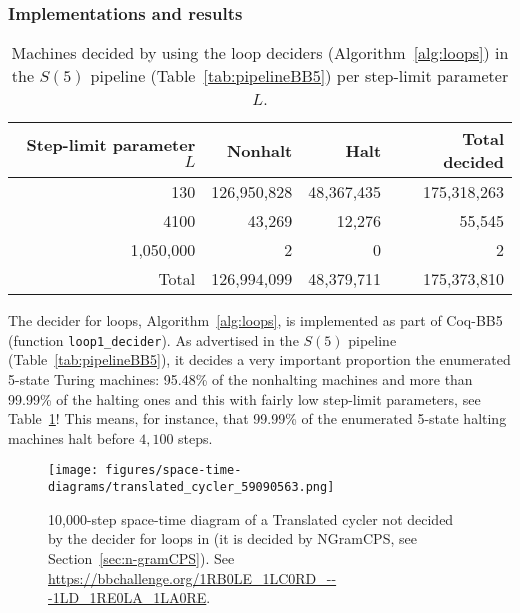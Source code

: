 \subsubsection{Implementations and results}\label{sec:loops:results}

\begin{table}[h!]
  \centering
  \begin{tabular}{|r|rrr|}
    \hline
    Step-limit parameter $L$ & Nonhalt     & Halt       & Total decided \\
    \hline
    130                      & 126,950,828 & 48,367,435 & 175,318,263   \\
    4100                     & 43,269      & 12,276     & 55,545        \\
    1,050,000                & 2           & 0          & 2             \\ \hline
    Total                    & 126,994,099 & 48,379,711 & 175,373,810   \\
    \hline
  \end{tabular}
  \caption{Machines decided by using the loop deciders (Algorithm~\ref{alg:loops}) in the $S(5)$ pipeline (Table~\ref{tab:pipelineBB5}) per step-limit parameter $L$.}\label{tab:paramsLoops}
\end{table}

The decider for loops, Algorithm~\ref{alg:loops}, is implemented as part of Coq-BB5 (function \texttt{loop1\_decider}). As advertised in the $S(5)$ pipeline (Table~\ref{tab:pipelineBB5}), it decides a very important proportion the enumerated 5-state Turing machines: 95.48\% of the nonhalting machines and more than 99.99\% of the halting ones and this with fairly low step-limit parameters, see Table~\ref{tab:paramsLoops}! This means, for instance, that 99.99\% of the enumerated 5-state halting machines halt before $4,100$ steps.

\begin{figure}
  \centering
  \texttt{[image: figures/space-time-diagrams/translated\_cycler\_59090563.png]}

  \caption{10,000-step space-time diagram of a Translated cycler not decided by the decider for loops in \CoqBB (it is decided by NGramCPS, see Section~\ref{sec:n-gramCPS}). See \url{https://bbchallenge.org/1RB0LE_1LC0RD_---1LD_1RE0LA_1LA0RE}.}\label{fig:translated-cyclers-more}
\end{figure}


